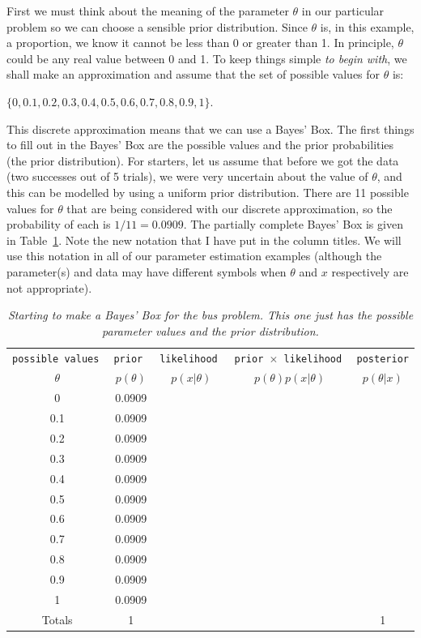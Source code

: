 First we must think about the meaning of the parameter $\theta$ in our particular
problem so we can choose a sensible prior distribution. Since $\theta$ is, in
this example, a proportion, we know it cannot be less than 0 or greater than 1.
In principle, $\theta$ could be any real value between 0 and 1. To keep things
simple {\it to begin with}, we shall make an approximation and assume that the
set of possible values for $\theta$ is:
\begin{center}
$\{0, 0.1, 0.2, 0.3, 0.4, 0.5, 0.6, 0.7, 0.8, 0.9, 1\}$.
\end{center}
This discrete
approximation means that we can use a Bayes' Box. The first things to fill out
in the Bayes' Box are the possible values and the prior probabilities (the prior
distribution). For starters, let us assume that before we got the data (two
successes out of 5 trials), we were very uncertain about the value of $\theta$,
and this can be modelled by using a uniform prior distribution. There are 11
possible values for $\theta$ that are being considered with our discrete
approximation, so the probability of each is $1/11 = 0.0909$. The partially
complete Bayes' Box is given in Table~\ref{tab:bus_bayes_box1}. Note the
new notation that I have put in the column titles. We will use this notation
in all of our parameter estimation examples (although the parameter(s) and data
may have different symbols when $\theta$ and $x$ respectively are not
appropriate).

\begin{table}[ht!]
\begin{center}
\begin{tabular}{|c|c|c|c|c|}
\hline
\tt{possible values} & \tt{prior} & \tt{likelihood} & \tt{prior} $\times$ \tt{likelihood} & \tt{posterior}\\
$\theta$ & $p(\theta)$ & $p(x|\theta)$ & $p(\theta)p(x|\theta)$ & $p(\theta|x)$\\
\hline
0 & 0.0909 &  &  & \\
0.1 & 0.0909 &  &  & \\
0.2 & 0.0909 &  &  & \\
0.3 & 0.0909 &  &  & \\
0.4 & 0.0909 &  &  & \\
0.5 & 0.0909 &  &  & \\
0.6 & 0.0909 &  &  & \\
0.7 & 0.0909 &  &  & \\
0.8 & 0.0909 &  &  & \\
0.9 & 0.0909 &  &  & \\
1 & 0.0909 &  &  & \\
\hline
Totals & 1 & & & 1\\
\hline
\end{tabular}
\caption{\it Starting to make a Bayes' Box for the bus problem. This one
just has the possible parameter values and the prior distribution.
\label{tab:bus_bayes_box1}}
\end{center}
\end{table}

